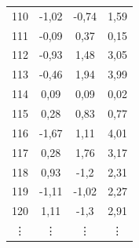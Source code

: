 \documentclass{article}
\begin{document}
\begin{table}[!p]
\begin{minipage}{0.5\textwidth}
{\begin{tabular}{cccc}
   110 & -1,02 & -0,74 &  1,59 \\
   111 & -0,09 &  0,37 &  0,15 \\
   112 & -0,93 &  1,48 &  3,05 \\
   113 & -0,46 &  1,94 &  3,99 \\
   114 &  0,09 &  0,09 &  0,02 \\
   115 &  0,28 &  0,83 &  0,77 \\
   116 & -1,67 &  1,11 &  4,01 \\
   117 &  0,28 &  1,76 &  3,17 \\
   118 &  0,93 & -1,2  &  2,31 \\
   119 & -1,11 & -1,02 &  2,27 \\
   120 &  1,11 & -1,3  &  2,91 \\
\vdots & \vdots & \vdots & \vdots  \\ 
\bottomrule
\end{tabular}}


\end{minipage}
\end{table}
\end{document}
